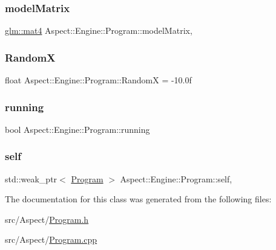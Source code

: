\subsubsection{\texorpdfstring{model\+Matrix}{modelMatrix}}
{\footnotesize\ttfamily \mbox{\hyperlink{group__core__types_ga7dcd2365c2e368e6af5b7adeb6a9c8df}{glm\+::mat4}} Aspect\+::\+Engine\+::\+Program\+::model\+Matrix\hspace{0.3cm}{\ttfamily [static]}, {\ttfamily [protected]}}

\mbox{\label{class_aspect_1_1_engine_1_1_program_ad2cae5125b23074393f6ad5681a24fa0}} 
\subsubsection{\texorpdfstring{RandomX}{RandomX}}
{\footnotesize\ttfamily float Aspect\+::\+Engine\+::\+Program\+::\+RandomX = -\/10.\+0f}

\mbox{\label{class_aspect_1_1_engine_1_1_program_a76e0a879e2a03987fc7242275d311579}} 
\subsubsection{\texorpdfstring{running}{running}}
{\footnotesize\ttfamily bool Aspect\+::\+Engine\+::\+Program\+::running}

\mbox{\label{class_aspect_1_1_engine_1_1_program_a956d0f100139d714030fa5449c2c2849}} 
\subsubsection{\texorpdfstring{self}{self}}
{\footnotesize\ttfamily std\+::weak\+\_\+ptr$<$ \mbox{\hyperlink{class_aspect_1_1_engine_1_1_program}{Program}} $>$ Aspect\+::\+Engine\+::\+Program\+::self\hspace{0.3cm}{\ttfamily [static]}, {\ttfamily [private]}}



The documentation for this class was generated from the following files\+:\begin{DoxyCompactItemize}
\item 
src/\+Aspect/\mbox{\hyperlink{_program_8h}{Program.\+h}}\item 
src/\+Aspect/\mbox{\hyperlink{_program_8cpp}{Program.\+cpp}}\end{DoxyCompactItemize}
